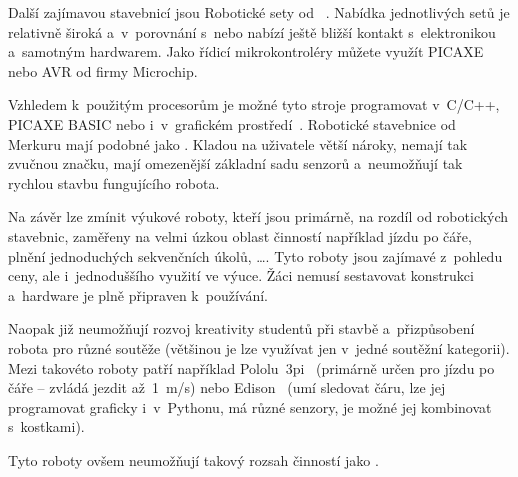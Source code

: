 
Další zajímavou stavebnicí jsou Robotické sety od ~\cite{merkur_roboticsSetsEshop}. 
Nabídka jednotlivých setů je relativně široká a~v~porovnání s~\legoM{ }nebo \fischerT{ }nabízí ještě bližší kontakt s~elektronikou a~samotným hardwarem. 
Jako řídicí mikrokontroléry můžete využít PICAXE nebo AVR od firmy Microchip. 

Vzhledem k~použitým procesorům je možné tyto stroje programovat v~C/C++, PICAXE BASIC nebo i~v~grafickém prostředí~\cite{picaxeCz_BlocklyForPICAXE}. 
Robotické stavebnice od Merkuru mají podobné  jako \fischerT. 
Kladou na uživatele větší nároky, nemají tak zvučnou značku, mají omezenější základní sadu senzorů a~neumožňují tak rychlou stavbu fungujícího robota.

Na závěr lze zmínit výukové roboty, kteří jsou primárně, na rozdíl od robotických stavebnic, zaměřeny na velmi úzkou oblast činností například jízdu po čáře, plnění jednoduchých sekvenčních úkolů, \dots{}.  
Tyto roboty jsou zajímavé z~pohledu ceny, ale i~jednoduššího využití ve výuce. Žáci nemusí sestavovat konstrukci a~hardware je plně připraven k~používání. 

Naopak již neumožňují rozvoj kreativity studentů při stavbě a~přizpůsobení robota pro různé soutěže (většinou je lze využívat jen v~jedné soutěžní kategorii).  
Mezi takovéto roboty patří například Pololu~3pi~\cite{robotPololu3pi} (primárně určen pro jízdu po čáře -- zvládá jezdit až~1~m/s) nebo Edison~\cite{robotEdison} (umí sledovat čáru, lze jej programovat graficky i~v~Pythonu, má různé senzory, je možné jej kombinovat s~\lego{ }kostkami). 

Tyto roboty ovšem neumožňují takový rozsah činností jako \legoM.

